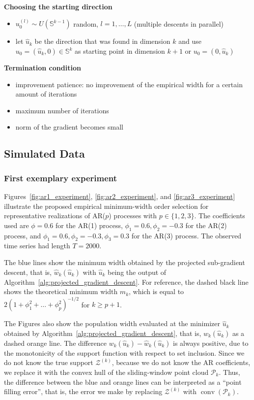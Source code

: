 \textbf{Choosing the starting direction}

\begin{itemize}
    \item $u_0^{(l)}\sim U(\mathbb{S}^{k-1})$ random, $l=1,\dots,L$ (multiple descents in parallel)
    \item let $\hat{u}_k$ be the direction that was found in dimension $k$ and use $u_0=(\hat{u}_k,0)\in\mathbb{S}^k$ as starting point in dimension $k+1$ or $u_0=(0,\hat{u}_k)$
\end{itemize}

\textbf{Termination condition}

\begin{itemize}
    \item improvement patience: no improvement of the empirical width for a certain amount of iterations
    \item maximum number of iterations
    \item norm of the gradient becomes small
\end{itemize}

\subsection{Simulated Data}

\subsubsection{First exemplary experiment}

Figures~\ref{fig:ar1_experiment}, \ref{fig:ar2_experiment}, and \ref{fig:ar3_experiment} illustrate the proposed empirical minimum-width order selection for representative realizations of AR($p$) processes with $p\in\{1,2,3\}$. The coefficients used are $\phi=0.6$ for the AR(1) process, $\phi_1=0.6,\phi_2=-0.3$ for the AR(2) process, and $\phi_1=0.6,\phi_2=-0.3,\phi_3=0.3$ for the AR(3) process. The observed time series had length $T=2000$.

The blue lines show the minimum width obtained by the projected sub-gradient descent, that is, $\hat{w}_k(\hat{u}_k)$ with $\hat{u}_k$ being the output of Algorithm~\ref{alg:projected_gradient_descent}. For reference, the dashed black line shows the theoretical minimum width $m_k$, which is equal to $2(1+\phi_1^2+\dots+\phi_p^2)^{-1/2}$ for $k\ge p+1$.

The Figures also show the population width evaluated at the minimizer $\hat{u}_k$ obtained by Algorithm~\ref{alg:projected_gradient_descent}, that is, $w_k(\hat{u}_k)$ as a dashed orange line. The difference $w_k(\hat{u}_k)-\hat{w}_k(\hat{u}_k)$ is always positive, due to the monotonicity of the support function with respect to set inclusion. Since we do not know the true support $\mathcal{Z}^{(k)}$, because we do not know the AR coefficients, we replace it with the convex hull of the sliding-window point cloud $\mathcal{P}_k$. Thus, the difference between the blue and orange lines can be interpreted as a \enquote{point filling error}, that is, the error we make by replacing $\mathcal{Z}^{(k)}$ with $\operatorname{conv}(\mathcal{P}_k)$.

